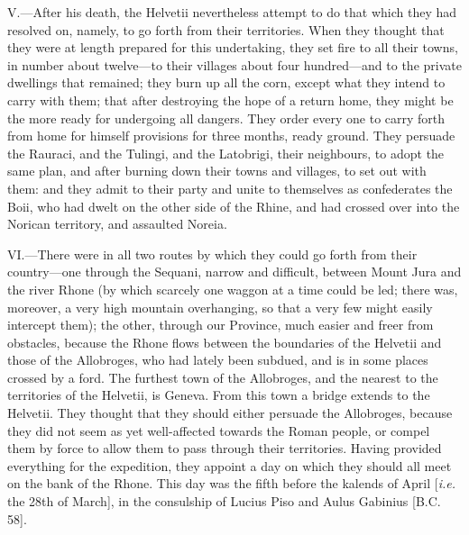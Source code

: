 V.—After his death, the Helvetii nevertheless attempt to do that which
they had resolved on, namely, to go forth from their territories. When
they thought that they were at length prepared for this undertaking,
they set fire to all their towns, in number about twelve—to their
villages about four hundred—and to the private dwellings that remained;
they burn up all the corn, except what they intend to carry with them;
that after destroying the hope of a return home, they might be the more
ready for undergoing all dangers. They order every one to carry forth
from home for himself provisions for three months, ready ground. They
persuade the Rauraci, and the Tulingi, and the Latobrigi, their
neighbours, to adopt the same plan, and after burning down their towns
and villages, to set out with them: and they admit to their party and
unite to themselves as confederates the Boii, who had dwelt on the other
side of the Rhine, and had crossed over into the Norican territory, and
assaulted Noreia.

VI.—There were in all two routes by which they could go forth from
their country—one through the Sequani, narrow and difficult, between
Mount Jura and the river Rhone (by which scarcely one waggon at a time
could be led; there was, moreover, a very high mountain overhanging, so
that a very few might easily intercept them); the other, through our
Province, much easier and freer from obstacles, because the Rhone flows
between the boundaries of the Helvetii and those of the Allobroges, who
had lately been subdued, and is in some places crossed by a ford. The
furthest town of the Allobroges, and the nearest to the territories of
the Helvetii, is Geneva. From this town a bridge extends to the
Helvetii. They thought that they should either persuade the Allobroges,
because they did not seem as yet well-affected towards the Roman people,
or compel them by force to allow them to pass through their territories.
Having provided everything for the expedition, they appoint a day on
which they should all meet on the bank of the Rhone. This day was the
fifth before the kalends of April [\emph{i.e.} the 28th of March], in the
consulship of Lucius Piso and Aulus Gabinius [B.C. 58].

